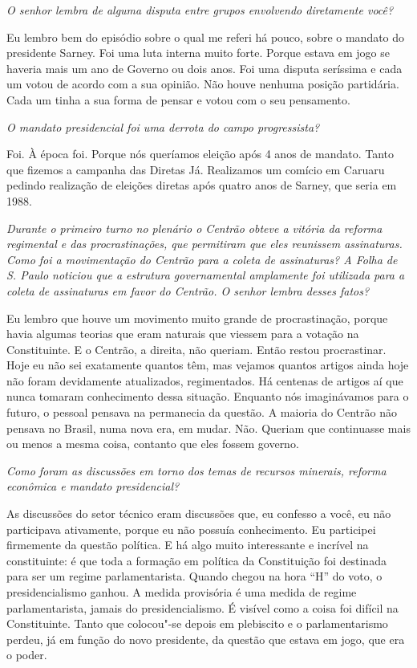 \medskip

\noindent\emph{O senhor lembra de alguma disputa entre grupos envolvendo
diretamente você?}

Eu lembro bem do episódio sobre o qual me referi há
pouco, sobre o mandato do presidente Sarney. Foi uma luta interna muito
forte. Porque estava em jogo se haveria mais um ano de Governo ou dois
anos. Foi uma disputa seríssima e cada um votou de acordo com a sua
opinião. Não houve nenhuma posição partidária. Cada um tinha a sua forma
de pensar e votou com o seu pensamento.

\medskip

\noindent\emph{O mandato presidencial foi uma derrota do campo progressista?}

Foi. À época foi. Porque nós queríamos eleição após 4
anos de mandato. Tanto que fizemos a campanha das Diretas Já. Realizamos
um comício em Caruaru pedindo realização de eleições diretas após quatro
anos de Sarney, que seria em 1988.

\medskip

\noindent\emph{Durante o primeiro turno no plenário o Centrão obteve a vitória
da reforma regimental e das procrastinações, que permitiram que eles
reunissem assinaturas. Como foi a movimentação do Centrão para a coleta
de assinaturas? A Folha de S. Paulo noticiou que a estrutura
governamental amplamente foi utilizada para a coleta de assinaturas em
favor do Centrão. O senhor lembra desses fatos?}

Eu lembro que houve um movimento muito grande de
procrastinação, porque havia algumas teorias que eram naturais que
viessem para a votação na Constituinte. E o Centrão, a direita, não
queriam. Então restou procrastinar. Hoje eu não sei exatamente quantos
têm, mas vejamos quantos artigos ainda hoje não foram devidamente
atualizados, regimentados. Há centenas de artigos aí que nunca tomaram
conhecimento dessa situação. Enquanto nós imaginávamos para o futuro, o
pessoal pensava na permanecia da questão. A maioria do Centrão não
pensava no Brasil, numa nova era, em mudar. Não. Queriam que continuasse
mais ou menos a mesma coisa, contanto que eles fossem governo.

\medskip

\noindent\emph{Como foram as discussões em torno dos temas de recursos
minerais, reforma econômica e mandato presidencial?}

As discussões do setor técnico eram discussões que, eu
confesso a você, eu não participava ativamente, porque eu não possuía
conhecimento. Eu participei firmemente da questão política. E há algo
muito interessante e incrível na constituinte: é que toda a formação em
política da Constituição foi destinada para ser um regime
parlamentarista. Quando chegou na hora ``H'' do voto, o presidencialismo
ganhou. A medida provisória é uma medida de regime parlamentarista,
jamais do presidencialismo. É visível como a coisa foi difícil na
Constituinte. Tanto que colocou"-se depois em plebiscito e o
parlamentarismo perdeu, já em função do novo presidente, da questão que
estava em jogo, que era o poder.

